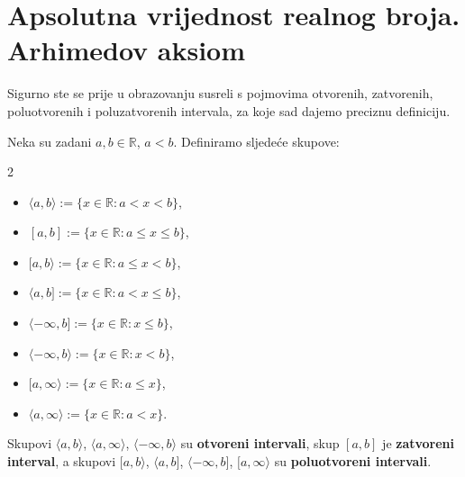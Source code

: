 \section{Apsolutna vrijednost realnog broja. Arhimedov aksiom}
Sigurno ste se prije u obrazovanju susreli s pojmovima otvorenih, zatvorenih, poluotvorenih i poluzatvorenih intervala, za koje sad dajemo preciznu definiciju.
\begin{definition}
Neka su zadani \(a, b\in \mathbb{R}\), \(a<b\). Definiramo sljedeće skupove:
\begin{multicols}{2}
\begin{itemize}
\item \(\langle a, b\rangle:=\{x\in \mathbb{R} : a<x<b\}\),
\item \([a, b]:=\{x\in \mathbb{R} : a\leq x\leq b\}\),
\item \([a, b\rangle:=\{x\in \mathbb{R} : a\leq x< b\}\),
\item \(\langle a, b]:=\{x\in \mathbb{R} : a< x\leq b\}\),
\item \(\langle -\infty, b]:=\{x\in \mathbb{R} : x\leq b\}\),
\item \(\langle -\infty, b\rangle:=\{x\in \mathbb{R} : x< b\}\),
\item \([a, \infty\rangle:=\{x\in \mathbb{R} : a\leq x\}\),
\item \(\langle a, \infty\rangle:=\{x\in \mathbb{R} : a< x\}\).
\end{itemize}
\end{multicols}
Skupovi \(\langle a,b \rangle\), \(\langle a,\infty \rangle\), \(\langle -\infty,b \rangle\) su \textbf{otvoreni intervali}, skup \([a, b]\) je \textbf{zatvoreni interval}, a skupovi \([a, b\rangle\), \(\langle a, b]\), \(\langle -\infty, b]\), \([a, \infty\rangle\) su \textbf{poluotvoreni intervali}.
\end{definition}
